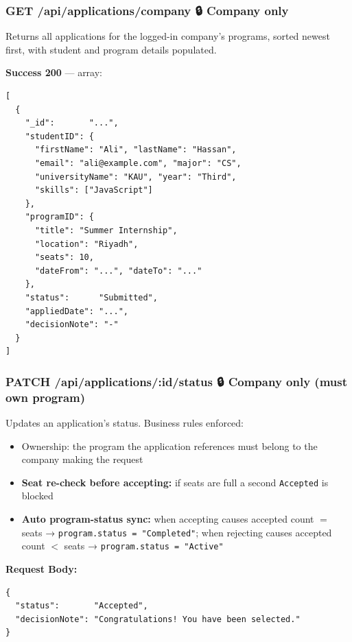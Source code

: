 \documentclass[12pt,a4paper]{article}
\begin{document}
\vspace{0.5cm}

\subsubsection*{GET /api/applications/company \quad 🔒 Company only}

Returns all applications for the logged-in company's programs, sorted newest first, with student and program details populated.

\textbf{Success 200} — array:
\begin{lstlisting}[language={}]
[
  {
    "_id":       "...",
    "studentID": {
      "firstName": "Ali", "lastName": "Hassan",
      "email": "ali@example.com", "major": "CS",
      "universityName": "KAU", "year": "Third",
      "skills": ["JavaScript"]
    },
    "programID": {
      "title": "Summer Internship",
      "location": "Riyadh",
      "seats": 10,
      "dateFrom": "...", "dateTo": "..."
    },
    "status":      "Submitted",
    "appliedDate": "...",
    "decisionNote": "-"
  }
]
\end{lstlisting}

\vspace{0.5cm}

\subsubsection*{PATCH /api/applications/:id/status \quad 🔒 Company only (must own program)}

Updates an application's status. Business rules enforced:
\begin{itemize}[leftmargin=1.5cm]
  \item Ownership: the program the application references must belong to the company making the request
  \item \textbf{Seat re-check before accepting:} if seats are full a second \texttt{Accepted} is blocked
  \item \textbf{Auto program-status sync:} when accepting causes accepted count $=$ seats → \texttt{program.status = "Completed"}; when rejecting causes accepted count $<$ seats → \texttt{program.status = "Active"}
\end{itemize}

\textbf{Request Body:}
\begin{lstlisting}[language={}]
{
  "status":       "Accepted",
  "decisionNote": "Congratulations! You have been selected."
}
\end{lstlisting}
\end{document}
